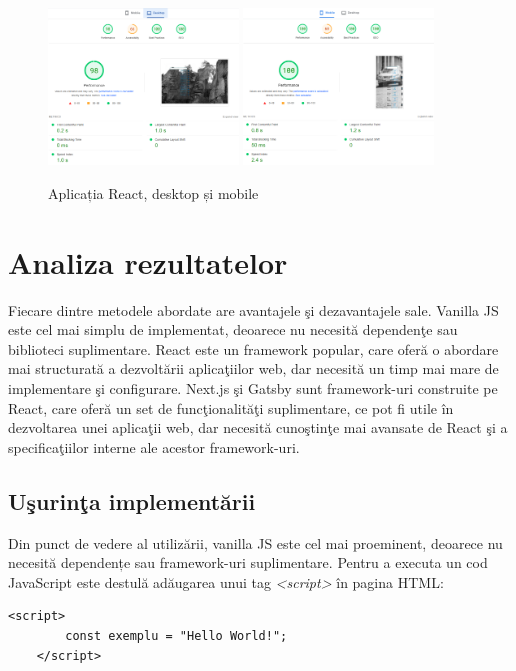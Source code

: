 \documentclass[12pt, a4paper]{report}
\begin{document}
\begin{figure}[htbp]
	\centering
	\includegraphics[width=0.45\textwidth]{02_desktop_pagespeed.png}
	\includegraphics[width=0.45\textwidth]{02_mobile_pagespeed.png}
	\caption{Aplicația React, desktop și mobile}
	\label{fig:02-deployed-pagespeed}
\end{figure}

\section {Analiza rezultatelor}

Fiecare dintre metodele abordate are avantajele \c si dezavantajele sale. Vanilla JS este cel mai simplu de implementat, deoarece nu necesit\u a dependen\c te sau biblioteci suplimentare. React este un framework popular, care ofer\u a o abordare mai structurat\u a a dezvolt\u arii aplica\c tiilor web, dar necesit\u a un timp mai mare de implementare \c si configurare. Next.js \c si Gatsby sunt framework-uri construite pe React, care ofer\u a un set de func\c tionalit\u a\c ti suplimentare, ce pot fi utile \^ in dezvoltarea unei aplica\c tii web, dar necesit\u a cuno\c stin\c te mai avansate de React \c si a specifica\c tiilor interne ale acestor framework-uri.

\subsection{U\c surin\c ta implement\u arii}
Din punct de vedere al utiliz\u arii, vanilla JS este cel mai proeminent, deoarece nu necesit\u a dependențe sau framework-uri suplimentare. Pentru a executa un cod JavaScript este destul\u a ad\u augarea unui tag \textit{\textless script\textgreater }   \^ in pagina HTML:
\begin{lstlisting}[caption={Exemplu de ad\u augare a unui script \^ in pagina HTML},captionpos=b]
	<script>
		const exemplu = "Hello World!";
	</script>
	\end{lstlisting}
\end{document}
